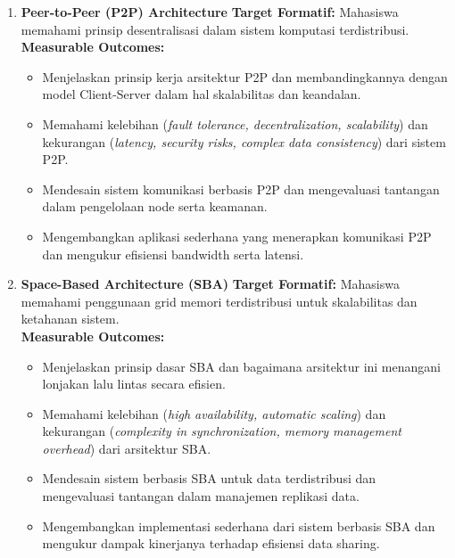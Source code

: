 \begin{enumerate}
\item \textbf{Peer-to-Peer (P2P) Architecture}  
\textbf{Target Formatif:} Mahasiswa memahami prinsip desentralisasi dalam sistem komputasi terdistribusi.  \\
\textbf{Measurable Outcomes:}
\begin{itemize}
\item Menjelaskan prinsip kerja arsitektur P2P dan membandingkannya dengan model Client-Server dalam hal skalabilitas dan keandalan.
\item Memahami kelebihan (\textit{fault tolerance, decentralization, scalability}) dan kekurangan (\textit{latency, security risks, complex data consistency}) dari sistem P2P.
\item Mendesain sistem komunikasi berbasis P2P dan mengevaluasi tantangan dalam pengelolaan node serta keamanan.
\item Mengembangkan aplikasi sederhana yang menerapkan komunikasi P2P dan mengukur efisiensi bandwidth serta latensi.
\end{itemize}

\item \textbf{Space-Based Architecture (SBA)}  
\textbf{Target Formatif:} Mahasiswa memahami penggunaan grid memori terdistribusi untuk skalabilitas dan ketahanan sistem.  \\
\textbf{Measurable Outcomes:}
\begin{itemize}
\item Menjelaskan prinsip dasar SBA dan bagaimana arsitektur ini menangani lonjakan lalu lintas secara efisien.
\item Memahami kelebihan (\textit{high availability, automatic scaling}) dan kekurangan (\textit{complexity in synchronization, memory management overhead}) dari arsitektur SBA.
\item Mendesain sistem berbasis SBA untuk data terdistribusi dan mengevaluasi tantangan dalam manajemen replikasi data.
\item Mengembangkan implementasi sederhana dari sistem berbasis SBA dan mengukur dampak kinerjanya terhadap efisiensi data sharing.
\end{itemize}


\end{enumerate}
